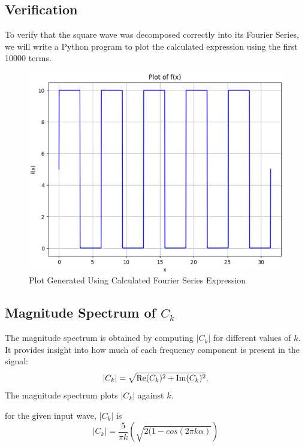 \begin{multicols}{2}
\subsection{Verification}
To verify that the square wave was decomposed correctly into its Fourier Series, we will write a Python program to plot the calculated expression using the first 10000 terms. \\
\begin{figure}[H]
  \centering
  \includegraphics[width=\columnwidth]{sections/1_plot.png}
  \caption{Plot Generated Using Calculated Fourier Series Expression}
\end{figure}

\subsection{Magnitude Spectrum of $C_k$}
The magnitude spectrum is obtained by computing $|C_k|$ for different values of $k$. It provides insight into how much of each frequency component is present in the signal:
\begin{equation}
    |C_k| = \sqrt{\operatorname{Re}(C_k)^2 + \operatorname{Im}(C_k)^2}.\\
\end{equation}
The magnitude spectrum plots $|C_k|$ against $k$.

for the given input wave, $|C_k|$ is 
\begin{equation}
    |C_k| =\frac{5}{\pi k}\left(\sqrt{2(1-cos(2\pi k\alpha)} \right)
\end{equation}


\end{multicols}
